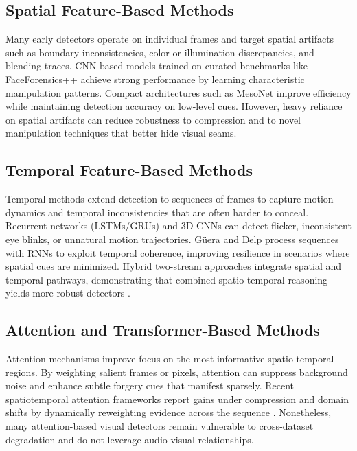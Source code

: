 \subsection{Spatial Feature-Based Methods}
Many early detectors operate on individual frames and target spatial artifacts such as boundary inconsistencies, color or illumination discrepancies, and blending traces. CNN-based models trained on curated benchmarks like FaceForensics++ \cite{rossler2019faceforensics} achieve strong performance by learning characteristic manipulation patterns. Compact architectures such as MesoNet \cite{afchar2018mesonet} improve efficiency while maintaining detection accuracy on low-level cues. However, heavy reliance on spatial artifacts can reduce robustness to compression and to novel manipulation techniques that better hide visual seams.

\subsection{Temporal Feature-Based Methods}
Temporal methods extend detection to sequences of frames to capture motion dynamics and temporal inconsistencies that are often harder to conceal. Recurrent networks (LSTMs/GRUs) and 3D CNNs can detect flicker, inconsistent eye blinks, or unnatural motion trajectories. Güera and Delp \cite{guera2018deepfake} process sequences with RNNs to exploit temporal coherence, improving resilience in scenarios where spatial cues are minimized. Hybrid two-stream approaches integrate spatial and temporal pathways, demonstrating that combined spatio-temporal reasoning yields more robust detectors \cite{zhou2017two}.

\subsection{Attention and Transformer-Based Methods}
Attention mechanisms improve focus on the most informative spatio-temporal regions. By weighting salient frames or pixels, attention can suppress background noise and enhance subtle forgery cues that manifest sparsely. Recent spatiotemporal attention frameworks report gains under compression and domain shifts by dynamically reweighting evidence across the sequence \cite{huang2024spatiotemporal}. Nonetheless, many attention-based visual detectors remain vulnerable to cross-dataset degradation and do not leverage audio-visual relationships.

